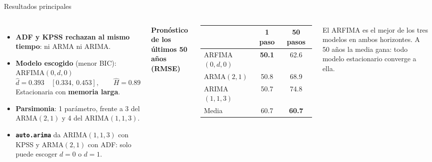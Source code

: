\documentclass[aspectratio=169,11pt]{beamer}
\newcommand{\destacar}[1]{\textcolor{udeaverde}{\textbf{#1}}}
\begin{document}
\begin{frame}{Resultados principales}
\begin{columns}[T]
\begin{itemize}
\item \textbf{ADF y KPSS rechazan al mismo tiempo}: ni ARMA ni ARIMA.
\item \textbf{Modelo escogido} (menor BIC): ARFIMA$(0,d,0)$
\[
\hat d = 0.393 \quad [0.334,\ 0.453], \qquad \hat H = 0.89
\]
Estacionaria con \destacar{memoria larga}.
\item \textbf{Parsimonia}: 1 parámetro, frente a 3 del ARMA$(2,1)$ y 4 del ARIMA$(1,1,3)$.
\item \textbf{\texttt{auto.arima}} da ARIMA$(1,1,3)$ con KPSS y ARMA$(2,1)$ con ADF: solo puede escoger $d=0$ o $d=1$.
\end{itemize}
\centering
\textbf{Pronóstico de los últimos 50 años (RMSE)}
\vspace{0.2cm}

\begin{tabular}{lcc}
\toprule
& \textbf{1 paso} & \textbf{50 pasos} \\
\midrule
\rowcolor{udeaclaro} ARFIMA$(0,d,0)$ & \textbf{50.1} & 62.6 \\
ARMA$(2,1)$ & 50.8 & 68.9 \\
ARIMA$(1,1,3)$ & 50.7 & 74.8 \\
Media & 60.7 & \textbf{60.7} \\
\bottomrule
\end{tabular}

\vspace{0.3cm}
\small
El ARFIMA es el mejor de los tres modelos en ambos horizontes. A 50 años la media gana: todo modelo estacionario converge a ella.
\end{columns}
\end{frame}

\end{document}
